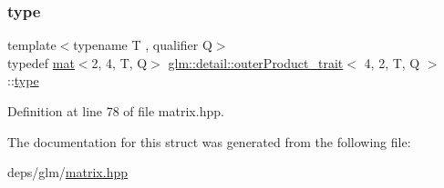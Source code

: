 \subsubsection{\texorpdfstring{type}{type}}
{\footnotesize\ttfamily template$<$typename T , qualifier Q$>$ \\
typedef \hyperlink{structglm_1_1mat}{mat}$<$2, 4, T, Q$>$ \hyperlink{structglm_1_1detail_1_1outerProduct__trait}{glm\+::detail\+::outer\+Product\+\_\+trait}$<$ 4, 2, T, Q $>$\+::\hyperlink{structglm_1_1mat_3_012_00_014_00_01T_00_01Q_01_4}{type}}



Definition at line 78 of file matrix.\+hpp.



The documentation for this struct was generated from the following file\+:\begin{DoxyCompactItemize}
\item 
deps/glm/\hyperlink{matrix_8hpp}{matrix.\+hpp}\end{DoxyCompactItemize}
